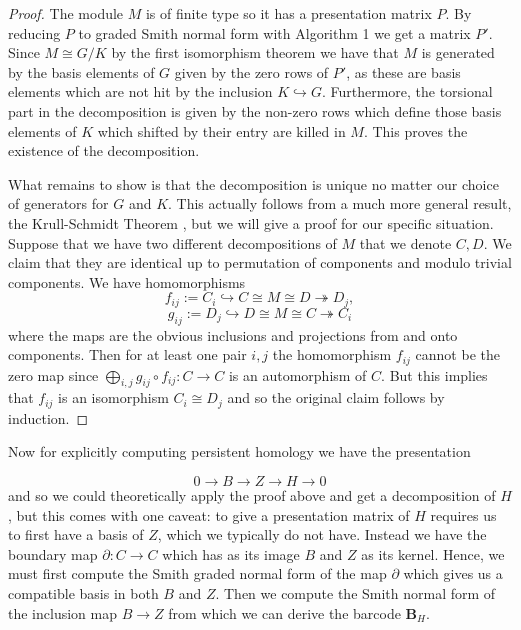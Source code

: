 \begin{proof}
  The module $M$ is of finite type so it has a presentation matrix $P$. By reducing $P$ to graded Smith normal form with Algorithm 1 we get a matrix $P'$. Since $M \cong G/K$ by the first isomorphism theorem we have that $M$ is generated by the basis elements of $G$ given by the zero rows of $P'$, as these are basis elements which are not hit by the inclusion $K \hookrightarrow G$. Furthermore, the torsional part in the decomposition is given by the non-zero rows which define those basis elements of $K$ which shifted by their entry are killed in $M$. This proves the existence of the decomposition.

  What remains to show is that the decomposition is unique no matter our choice of generators for $G$ and $K$. This actually follows from a much more general result, the Krull-Schmidt Theorem \cite[p. ~115]{jacobson2009basic}, but we will give a proof for our specific situation. Suppose that we have two different decompositions of $M$ that we denote $C,D$. We claim that they are identical up to permutation of components and modulo trivial components. We have homomorphisms
  \[
    f_{ij} := C_{i} \hookrightarrow C \cong M  \cong D  \twoheadrightarrow D_{j},
  \]
  \[
    g_{ij} :=  D_{j} \hookrightarrow D \cong M  \cong C  \twoheadrightarrow C_{i}
  \]
  where the maps are the obvious inclusions and projections from and onto components. Then for at least one pair $i,j$ the homomorphism $f_{ij}$ cannot be the zero map since $\bigoplus_{i,j} g_{ij} \circ f_{ij}: C \to C$ is an automorphism of $C$. But this implies that $f_{ij}$ is an isomorphism $C_{i} \cong D_{j}$ and so the original claim follows by induction.

\end{proof}
Now for explicitly computing persistent homology we have the presentation

\[
  0 \to B \to Z \to H \to 0
\]
and so we could theoretically apply the proof above and get a decomposition of $H$, but this comes with one caveat: to give a presentation matrix of $H$ requires us to first have a basis of $Z$, which we typically do not have. Instead we have the boundary map $\partial: C \to C$ which has as its image $B$ and $Z$ as its kernel. Hence, we must first compute the Smith graded normal form of the map $\partial$ which gives us a compatible basis in both $B$ and $Z$. Then we compute the Smith normal form of the inclusion map $B \to Z$ from which we can derive the barcode $\mathbf{B}_{H}$.

